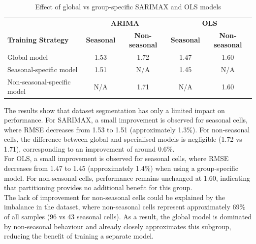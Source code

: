 \begin{table}[htbp]
	\centering
	\caption{Effect of global vs group-specific SARIMAX and OLS models}
	\label{tab:model_ablation}
	
	\begin{tabular}{lcc|cc}
		\toprule
		& \multicolumn{2}{c|}{\textbf{ARIMA}} & \multicolumn{2}{c}{\textbf{OLS}} \\
		\textbf{Training Strategy} 
		& \textbf{Seasonal} 
		& \textbf{Non-seasonal} 
		& \textbf{Seasonal} 
		& \textbf{Non-seasonal} \\
		\midrule
		Global model 
		& 1.53 & 1.72 & 1.47 & 1.60 \\
		
		Seasonal-specific model 
		& 1.51 & N/A & 1.45 & N/A \\
		
		Non-seasonal-specific model 
		& N/A & 1.71 & N/A & 1.60 \\
		\bottomrule
	\end{tabular}
\end{table}



The results show that dataset segmentation has only a limited impact on performance. For SARIMAX, a small improvement is observed for seasonal cells, where RMSE decreases from 1.53 to 1.51 (approximately 1.3\%). For non-seasonal cells, the difference between global and specialised models is negligible (1.72 vs 1.71), corresponding to an improvement of around 0.6\%. \\

For OLS, a small improvement is observed for seasonal cells, 
 where RMSE decreases from 1.47 to 1.45 (approximately 1.4\%) 
when using a group-specific model. For non-seasonal cells, 
performance remains unchanged at 1.60, indicating that 
partitioning provides no additional benefit for this group. \\

The lack of improvement for non-seasonal cells could be explained by the imbalance in the dataset, where non-seasonal cells represent approximately 69\% of all samples (96 vs 43 seasonal cells). As a result, the global model is dominated by non-seasonal behaviour and already closely approximates this subgroup, reducing the benefit of training a separate model. \\



